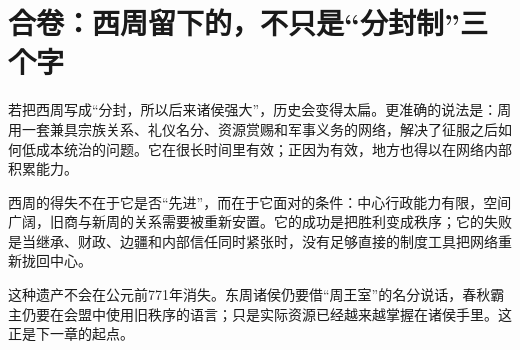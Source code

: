 \section{合卷：西周留下的，不只是“分封制”三个字}

若把西周写成“分封，所以后来诸侯强大”，历史会变得太扁。更准确的说法是：周用一套兼具宗族关系、礼仪名分、资源赏赐和军事义务的网络，解决了征服之后如何低成本统治的问题。它在很长时间里有效；正因为有效，地方也得以在网络内部积累能力。

西周的得失不在于它是否“先进”，而在于它面对的条件：中心行政能力有限，空间广阔，旧商与新周的关系需要被重新安置。它的成功是把胜利变成秩序；它的失败是当继承、财政、边疆和内部信任同时紧张时，没有足够直接的制度工具把网络重新拢回中心。

这种遗产不会在公元前771年消失。东周诸侯仍要借“周王室”的名分说话，春秋霸主仍要在会盟中使用旧秩序的语言；只是实际资源已经越来越掌握在诸侯手里。这正是下一章的起点。
